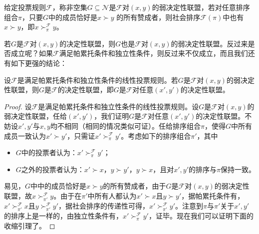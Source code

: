 \begin{definition}[弱决定性联盟]
给定投票规则$\mathcal F$，称非空集$G\subseteq \mathcal N$是$\mathcal F$对$(x,y)$的弱决定性联盟，若对任意排序组合$\pi$，只要$G$中的成员恰好是$x\succ y$ 的所有赞成者，则社会排序$\mathcal F(\pi)$中也有$x\succ y$，即$x\succ_\pi^{\mathcal F}y$。
\end{definition}
若$G$是$\mathcal F$对$(x,y)$的决定性联盟，则$G$也是$\mathcal F$对$(x,y)$的弱决定性联盟。反过来是否成立呢？如果$\mathcal F$满足帕累托条件和独立性条件，则反过来不仅成立，而且我们还有如下更强的结论：
\begin{lemma}
设$\mathcal{F}$是满足帕累托条件和独立性条件的线性投票规则。若$G$是$\mathcal F$对$(x,y)$的弱决定性联盟，则$G$是$\mathcal F$的决定性联盟，即$G$是$\mathcal F$对任意$(x',y')$的决定性联盟。
\end{lemma}
\begin{proof}
设$\mathcal{F}$是满足帕累托条件和独立性条件的线性投票规则。设$G$是$\mathcal F$对$(x,y)$的弱决定性联盟，任给$(x',y')$，我们证明$G$是$\mathcal F$对任意$(x',y')$的决定性联盟。不妨设$x',y'$与$x,y$均不相同（相同的情况类似可证）。任给排序组合$\pi$，使得$G$中所有成员一致认为$x'\succ y'$，只需证$x'\succ_\pi^{\mathcal F}y'$。考虑如下的排序组合$\pi'$，其中
\begin{itemize}
  \item $G$中的投票者认为：$x'\succ_\pi^{\mathcal F}y'$；
  \item $G$之外的投票者认为：$x'\succ x$，$y\succ y'$，$y\succ x$，且对$x',y'$的排序与$\pi$保持一致。
\end{itemize}
易见，$G$中中的成员恰好是$x\succ y$的所有赞成者，由于$G$是$\mathcal F$对$(x,y)$的弱决定性联盟，故$x\succ_{\pi'}^{\mathcal F}y$。由于在$\pi'$中所有人都认为$x'\succ x$且$y\succ y'$，据帕累托条件有，$x'\succ_{\pi'}^{\mathcal F}x$且$y\succ_{\pi'}^{\mathcal F}y'$，据社会排序的传递性可得，$x'\succ_{\pi'}^{\mathcal F}y'$。注意到$\pi$与$\pi'$关于$x',y'$的排序上是一样的，由独立性条件有，$x'\succ_{\pi}^{\mathcal F}y'$，证毕。现在我们可以证明下面的收缩引理了。
\end{proof}

